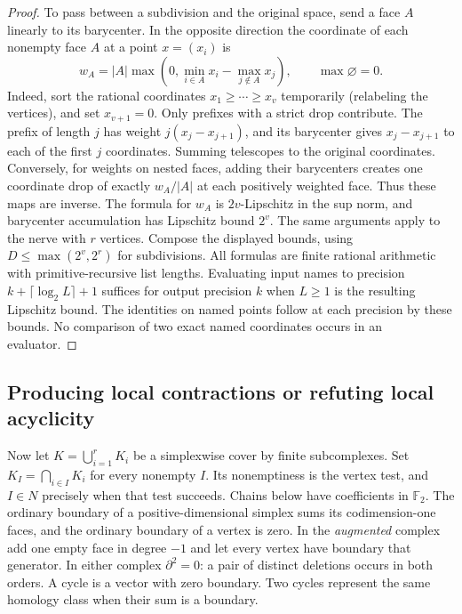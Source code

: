 \begin{proof}
To pass between a subdivision and the original space, send a face $A$
linearly to its barycenter. In the opposite direction the coordinate of
each nonempty face $A$ at a point $x=(x_i)$ is
\[
 w_A=|A|\max\!\left(0,\min_{i\in A} x_i-\max_{j\notin A}x_j\right),
 \qquad \max\varnothing=0 .
\]
Indeed, sort the rational coordinates $x_1\ge\cdots\ge x_v$ temporarily
(relabeling the vertices), and set $x_{v+1}=0$. Only prefixes with a
strict drop contribute. The prefix of length $j$ has weight
$j(x_j-x_{j+1})$, and its barycenter gives $x_j-x_{j+1}$ to each of
the first $j$ coordinates. Summing telescopes to the original coordinates.
Conversely, for weights on nested faces, adding their barycenters creates
one coordinate drop of exactly $w_A/|A|$ at each positively weighted
face. Thus these maps are inverse. The formula for $w_A$ is
$2v$-Lipschitz in the sup norm, and barycenter accumulation has
Lipschitz bound $2^v$. The same arguments apply to the nerve with $r$
vertices. Compose the displayed bounds, using
$D\le\max(2^v,2^r)$ for subdivisions. All formulas are finite rational
arithmetic with primitive-recursive list lengths. Evaluating input names
to precision $k+\lceil\log_2 L\rceil+1$ suffices for output precision
$k$ when $L\ge1$ is the resulting Lipschitz bound. The identities on
named points follow at each precision by these bounds. No comparison of
two exact named coordinates occurs in an evaluator.
\end{proof}

\subsection{Producing local contractions or refuting local acyclicity}

Now let $K=\bigcup_{i=1}^r K_i$ be a simplexwise cover by finite
subcomplexes. Set $K_I=\bigcap_{i\in I}K_i$ for every nonempty $I$.
Its nonemptiness is the vertex test, and $I\in N$ precisely when that
test succeeds. Chains below have coefficients in $\mathbb F_2$. The
ordinary boundary of a positive-dimensional simplex sums its codimension-one
faces, and the ordinary boundary of a vertex is zero. In the
\emph{augmented} complex add one empty face in degree $-1$ and let
every vertex have boundary that generator. In either complex
$\partial^2=0$: a pair of distinct deletions occurs in both orders. A
cycle is a vector with zero boundary. Two cycles represent the same
homology class when their sum is a boundary.

